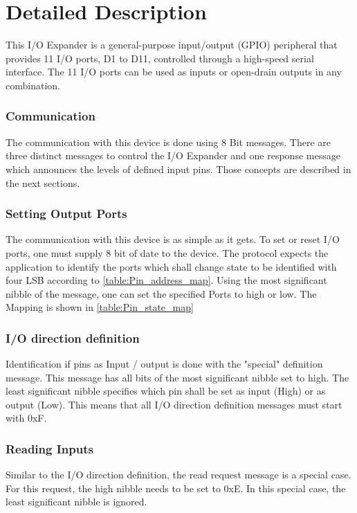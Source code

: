 \documentclass[10pt]{datasheet}
\begin{document}
\newpage
\twocolumn
\section{Detailed Description}

This I/O Expander is a general-purpose input/output (GPIO)
peripheral that provides 11 I/O ports, D1 to D11, controlled through a 
high-speed serial interface. The 11 I/O ports can be used as inputs or
open-drain outputs in any combination.

\subsubsection{Communication}
The communication with this device is done using 8 Bit messages. There are 
three distinct messages to control the I/O Expander and one response message 
which announces the levels of defined input pins. Those concepts are described 
in the next sections.

\subsubsection{Setting Output Ports}
The communication with this device is as simple as it gets. To set or reset I/O 
ports, one must supply 8 bit of date to the device. The protocol expects the 
application to identify the ports which shall change state to be identified 
with four LSB according to \ref{table:Pin_address_map}. Using the most 
significant nibble of the message, one can set the specified Ports to high or 
low. The Mapping is shown in \ref{table:Pin_state_map}

\vfill\break

\subsubsection{I/O direction definition}
Identification if pins as Input / output is done with the "special" definition 
message. This message has all bits of the most significant nibble set to high. 
The least significant nibble specifies which pin shall be set as input (High) 
or as output (Low). This means that all I/O direction definition messages must 
start with 0xF.

\subsubsection{Reading Inputs}
Similar to the I/O direction definition, the read request message is a special 
case. For this request, the high nibble needs to be set to 0xE. In this special 
case, the least significant nibble is ignored.
\end{document}
